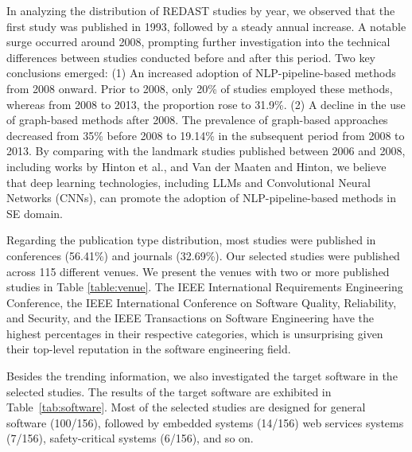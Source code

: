In analyzing the distribution of REDAST studies by year, we observed that the first study was published in 1993, followed by a steady annual increase. A notable surge occurred around 2008, prompting further investigation into the technical differences between studies conducted before and after this period. Two key conclusions emerged: (1) An increased adoption of NLP-pipeline-based methods from 2008 onward. Prior to 2008, only 20\% of studies employed these methods, whereas from 2008 to 2013, the proportion rose to 31.9\%. (2) A decline in the use of graph-based methods after 2008. The prevalence of graph-based approaches decreased from 35\% before 2008 to 19.14\% in the subsequent period from 2008 to 2013. By comparing with the landmark studies published between 2006 and 2008, including works by Hinton et al., \cite{hinton2006fast} and Van der Maaten and Hinton\cite{van2008visualizing}, we believe that deep learning technologies, including LLMs and Convolutional Neural Networks (CNNs), can promote the adoption of NLP-pipeline-based methods in SE domain.

Regarding the publication type distribution, most studies were published in conferences (56.41\%) and journals (32.69\%). Our selected studies were published across 115 different venues. We present the venues with two or more published studies in Table \ref{table:venue}. The IEEE International Requirements Engineering Conference, the IEEE International Conference on Software Quality, Reliability, and Security, and the IEEE Transactions on Software Engineering have the highest percentages in their respective categories, which is unsurprising given their top-level reputation in the software engineering field.

Besides the trending information, we also investigated the target software in the selected studies. The results of the target software are exhibited in Table~\ref{tab:software}. Most of the selected studies are designed for general software (100/156), followed by embedded systems (14/156) web services systems (7/156), safety-critical systems (6/156), and so on.